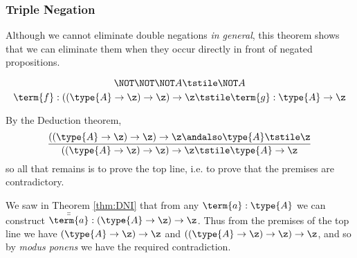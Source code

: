 


\subsubsection{Triple Negation}

Although we cannot eliminate double negations \emph{in general}, this theorem shows that we can eliminate them when they occur directly in front of negated propositions.

\begin{Theorem}
\[
\NOT\NOT\NOT A
\tstile
\NOT A
\]
\[
\term{f}:((\type{A} \to \z) \to \z) \to \z
\tstile
\term{g}:\type{A} \to \z
\]
\end{Theorem}
\begin{Proof}
By the Deduction theorem, 
\[
\frac{
((\type{A} \to \z) \to \z) \to \z \andalso \type{A}
\tstile
\z
}{
((\type{A} \to \z) \to \z) \to \z
\tstile
\type{A} \to \z
}
\]
so all that remains is to prove the top line, i.e. to prove that the premises are contradictory.

We saw in Theorem \ref{thm:DNI} that from any $\term{a}:\type{A}$ we can construct $\bar{\bar{\term{a}}}: (\type{A} \to \z) \to \z$.  Thus from the premises of the top line we have 
$(\type{A} \to \z) \to \z$
and 
$((\type{A} \to \z) \to \z) \to \z$, and so by \emph{modus ponens} we have the required contradiction.
\end{Proof}


